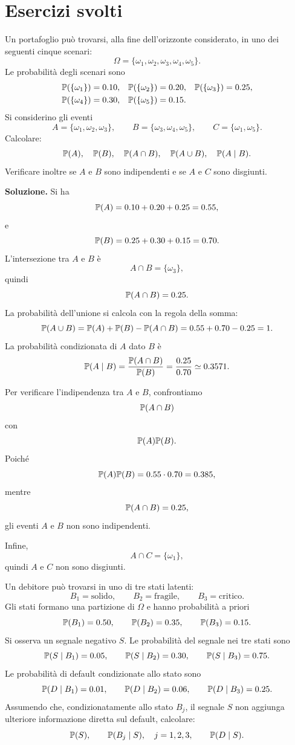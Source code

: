 \section{Esercizi svolti}

\begin{exercise}
\label{ex:cap1-eventi-condizionamento-indipendenza}
Un portafoglio pu\`{o} trovarsi, alla fine dell'orizzonte considerato, in uno
dei seguenti cinque scenari:
\[
\Omega=\{\omega_1,\omega_2,\omega_3,\omega_4,\omega_5\}.
\]
Le probabilit\`{a} degli scenari sono
\[
\begin{aligned}
\mathbb{P}(\{\omega_1\})&=0.10, &
\mathbb{P}(\{\omega_2\})&=0.20, &
\mathbb{P}(\{\omega_3\})&=0.25,\\
\mathbb{P}(\{\omega_4\})&=0.30, &
\mathbb{P}(\{\omega_5\})&=0.15.
\end{aligned}
\]
Si considerino gli eventi
\[
A=\{\omega_1,\omega_2,\omega_3\},
\qquad
B=\{\omega_3,\omega_4,\omega_5\},
\qquad
C=\{\omega_1,\omega_5\}.
\]
Calcolare:
\[
\mathbb{P}(A),\quad \mathbb{P}(B),\quad
\mathbb{P}(A\cap B),\quad \mathbb{P}(A\cup B),
\quad \mathbb{P}(A\mid B).
\]
Verificare inoltre se $A$ e $B$ sono indipendenti e se $A$ e $C$ sono disgiunti.
\end{exercise}

\noindent
\textbf{Soluzione.}
Si ha
\[
\mathbb{P}(A)=0.10+0.20+0.25=0.55,
\]
e
\[
\mathbb{P}(B)=0.25+0.30+0.15=0.70.
\]
L'intersezione tra $A$ e $B$ \`{e}
\[
A\cap B=\{\omega_3\},
\]
quindi
\[
\mathbb{P}(A\cap B)=0.25.
\]
La probabilit\`{a} dell'unione si calcola con la regola della somma:
\[
\mathbb{P}(A\cup B)
=
\mathbb{P}(A)+\mathbb{P}(B)-\mathbb{P}(A\cap B)
=
0.55+0.70-0.25=1.
\]
La probabilit\`{a} condizionata di $A$ dato $B$ \`{e}
\[
\mathbb{P}(A\mid B)
=
\frac{\mathbb{P}(A\cap B)}{\mathbb{P}(B)}
=
\frac{0.25}{0.70}
\simeq 0.3571.
\]

Per verificare l'indipendenza tra $A$ e $B$, confrontiamo
\[
\mathbb{P}(A\cap B)
\]
con
\[
\mathbb{P}(A)\mathbb{P}(B).
\]
Poich\'{e}
\[
\mathbb{P}(A)\mathbb{P}(B)=0.55\cdot0.70=0.385,
\]
mentre
\[
\mathbb{P}(A\cap B)=0.25,
\]
gli eventi $A$ e $B$ non sono indipendenti.

Infine,
\[
A\cap C=\{\omega_1\},
\]
quindi $A$ e $C$ non sono disgiunti.

\begin{exercise}
\label{ex:cap1-bayes-rischio-default}
Un debitore pu\`{o} trovarsi in uno di tre stati latenti:
\[
B_1=\text{solido},\qquad B_2=\text{fragile},\qquad B_3=\text{critico}.
\]
Gli stati formano una partizione di $\Omega$ e hanno probabilit\`{a} a priori
\[
\mathbb{P}(B_1)=0.50,\qquad
\mathbb{P}(B_2)=0.35,\qquad
\mathbb{P}(B_3)=0.15.
\]
Si osserva un segnale negativo $S$. Le probabilit\`{a} del segnale nei tre stati sono
\[
\mathbb{P}(S\mid B_1)=0.05,\qquad
\mathbb{P}(S\mid B_2)=0.30,\qquad
\mathbb{P}(S\mid B_3)=0.75.
\]
Le probabilit\`{a} di default condizionate allo stato sono
\[
\mathbb{P}(D\mid B_1)=0.01,\qquad
\mathbb{P}(D\mid B_2)=0.06,\qquad
\mathbb{P}(D\mid B_3)=0.25.
\]
Assumendo che, condizionatamente allo stato $B_j$, il segnale $S$ non aggiunga
ulteriore informazione diretta sul default, calcolare:
\[
\mathbb{P}(S),
\qquad
\mathbb{P}(B_j\mid S),\quad j=1,2,3,
\qquad
\mathbb{P}(D\mid S).
\]
\end{exercise}

